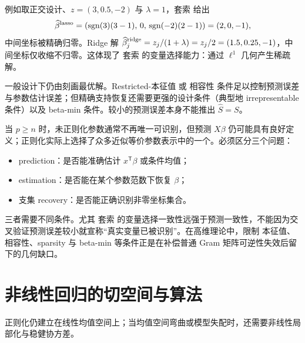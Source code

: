 \begin{workedexample}
例如取正交设计、$z=(3,0.5,-2)$ 与 $\lambda=1$，套索 给出
\[
\widehat\beta^{\rm lasso}=(\operatorname{sgn}(3)(3-1),\,0,\,\operatorname{sgn}(-2)(2-1))=(2,0,-1),
\]
中间坐标被精确归零。Ridge 解 $\widehat\beta^{\rm ridge}_j=z_j/(1+\lambda)=z_j/2=(1.5,0.25,-1)$，中间坐标仅收缩不归零。这体现了 套索 的变量选择能力：通过 $\ell^1$ 几何产生稀疏解。
\end{workedexample}

\begin{note}[预测、参数估计与支集恢复的不同条件]
一般设计下仍由刻画最优解。Restricted-本征值 或 相容性 条件足以控制预测误差与参数估计误差；但精确支持恢复还需要更强的设计条件（典型地 irrepresentable 条件）以及 beta-min 条件。较小的预测误差本身不能推出 $\widehat S=S$。

当 $p\ge n$ 时，未正则化参数通常不再唯一可识别，但预测 $X\beta$ 仍可能具有良好定义；正则化实际上选择了众多近似等价参数表示中的一个。必须区分三个问题：
\begin{itemize}
\item prediction：是否能准确估计 $x^{\mathsf T}\beta$ 或条件均值；
\item estimation：是否能在某个参数范数下恢复 $\beta$；
\item 支集 recovery：是否能正确识别非零坐标集合。
\end{itemize}
三者需要不同条件。尤其 套索 的变量选择一致性远强于预测一致性，不能因为交叉验证预测误差较小就宣称“真实变量已被识别”。在高维理论中，限制 本征值、相容性、sparsity 与 beta-min 等条件正是在补偿普通 Gram 矩阵可逆性失效后留下的几何缺口。
\end{note}

\section{非线性回归的切空间与算法}

正则化仍建立在线性均值空间上；当均值空间弯曲或模型失配时，还需要非线性局部化与稳健协方差。

